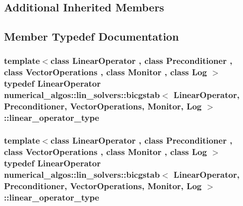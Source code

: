 \subsection*{Additional Inherited Members}


\subsection{Member Typedef Documentation}
\hypertarget{classnumerical__algos_1_1lin__solvers_1_1bicgstab_a77f7bc99b7f22986f73ce7d2b4ebd669}{
\subsubsection[{linear\-\_\-operator\-\_\-type}]{\setlength{\rightskip}{0pt plus 5cm}template$<$class Linear\-Operator , class Preconditioner , class Vector\-Operations , class Monitor , class Log $>$ typedef Linear\-Operator {\bf numerical\-\_\-algos\-::lin\-\_\-solvers\-::bicgstab}$<$ Linear\-Operator, Preconditioner, Vector\-Operations, Monitor, Log $>$\-::{\bf linear\-\_\-operator\-\_\-type}}}\label{classnumerical__algos_1_1lin__solvers_1_1bicgstab_a77f7bc99b7f22986f73ce7d2b4ebd669}
\hypertarget{classnumerical__algos_1_1lin__solvers_1_1bicgstab_a77f7bc99b7f22986f73ce7d2b4ebd669}{
\subsubsection[{linear\-\_\-operator\-\_\-type}]{\setlength{\rightskip}{0pt plus 5cm}template$<$class Linear\-Operator , class Preconditioner , class Vector\-Operations , class Monitor , class Log $>$ typedef Linear\-Operator {\bf numerical\-\_\-algos\-::lin\-\_\-solvers\-::bicgstab}$<$ Linear\-Operator, Preconditioner, Vector\-Operations, Monitor, Log $>$\-::{\bf linear\-\_\-operator\-\_\-type}}}\label{classnumerical__algos_1_1lin__solvers_1_1bicgstab_a77f7bc99b7f22986f73ce7d2b4ebd669}
